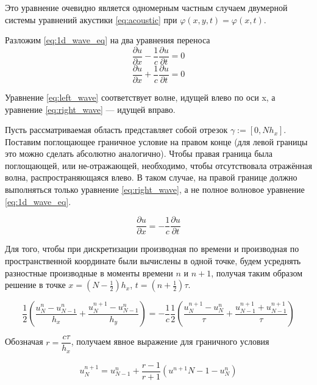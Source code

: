 Это уравнение очевидно является одномерным частным случаем двумерной системы уравнений акустики \eqref{eq:acoustic} при $\varphi(x,y,t) = \varphi(x,t)$.

Разложим \eqref{eq:1d_wave_eq} на два уравнения переноса
\begin{equation}
    \dfrac{\partial u}{\partial x} - \dfrac{1}{c} \dfrac{\partial u}{\partial t} = 0
    \label{eq:left_wave}
\end{equation}
\begin{equation}
    \dfrac{\partial u}{\partial x} + \dfrac{1}{c} \dfrac{\partial u}{\partial t} = 0
    \label{eq:right_wave}
\end{equation}

Уравнение \eqref{eq:left_wave} соответствует волне, идущей влево по оси x, а уравнение \eqref{eq:right_wave} --- идущей вправо.

Пусть рассматриваемая область представляет собой отрезок $\gamma := [0, N h_x]$. Поставим поглощающее граничное условие на правом конце (для левой границы это можно сделать абсолютно аналогично). Чтобы правая граница была поглощающей, или не-отражающей, необходимо, чтобы отсутствовала отражённая волна, распространяющаяся влево. В таком случае, на правой границе должно выполняться только уравнение \eqref{eq:right_wave}, а не полное волновое уравнение \eqref{eq:1d_wave_eq}.

\begin{equation}
    \dfrac{\partial u}{\partial x} = -\dfrac{1}{c} \dfrac{\partial u}{\partial t}
\end{equation}

Для того, чтобы при дискретизации производная по времени и производная по пространственной координате были вычислены в одной точке, будем усреднять разностные производные в моменты времени $n$ и $n+1$, получая таким образом решение в точке $x = \left(N-\frac{1}{2}\right)h_x$, $t=\left(n+\frac{1}{2}\right)\tau$. \cite{arch_comp_sim} \cite{idk_book}

\begin{equation}
    \dfrac{1}{2} \left(\dfrac{u^n_N - u^n_{N-1}}{h_x} + \dfrac{u^{n+1}_N - u^n_{N-1}}{h_y} \right) = -\dfrac{1}{c} \dfrac{1}{2}\left(\dfrac{u^{n+1}_N - u^n_N}{\tau} + \dfrac{u^{n+1}_{N-1} + u^{n+1}_{N-1}}{\tau} \right)
\end{equation}

Обозначая $r = \dfrac{c \tau}{h_x}$, получаем явное выражение для граничного условия

\begin{equation}
    u^{n+1}_N = u^n_{N-1} + \dfrac{r-1}{r+1}(u^{n+1}{N-1}-u^n_N)
\end{equation}

